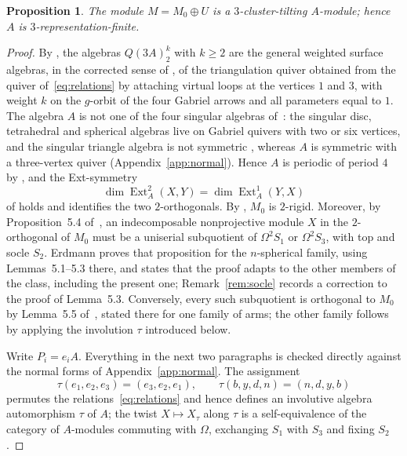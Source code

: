 \documentclass[11pt]{amsart}
\theoremstyle{plain}
\newtheorem{proposition}[theorem]{Proposition}
\theoremstyle{definition}
\DeclareMathOperator{\Ext}{Ext}
\begin{document}
\begin{proposition}\label{prop:RF}
The module $M=M_0\oplus U$ is a $3$-cluster-tilting $A$-module; hence $A$ is $3$-representation-finite.
\end{proposition}

\begin{proof}
By \cite[\S3.2]{Erdmann}, the algebras $Q(3A)^k_2$ with $k\ge2$ are the general weighted surface algebras, in
the corrected sense of \cite{ErdmannSkowronskiGV,ErdmannSkowronskiCorr}, of the triangulation quiver obtained
from the quiver of~\eqref{eq:relations} by attaching virtual loops at the vertices $1$ and $3$, with weight
$k$ on the $g$-orbit of the four Gabriel arrows and all parameters equal to $1$. The algebra $A$ is not one of
the four singular algebras of~\cite{ErdmannSkowronskiGV}: the singular disc, tetrahedral and spherical
algebras live on Gabriel quivers with two or six vertices, and the singular triangle algebra is not symmetric
\cite[Remark~4.1 and Proposition~4.9]{ErdmannSkowronskiGV}, whereas $A$ is symmetric with a three-vertex
quiver (Appendix~\ref{app:normal}). Hence $A$ is periodic of period $4$ by
\cite[Theorem~1.3]{ErdmannSkowronskiGV}, and the Ext-symmetry
\begin{equation}\label{eq:extsym}
 \dim\Ext^2_A(X,Y)=\dim\Ext^1_A(Y,X)
\end{equation}
of \cite[Corollary~2.1]{Erdmann} holds and identifies the two $2$-orthogonals. By
\cite[Proposition~4.3]{Erdmann}, $M_0$ is $2$-rigid. Moreover, by Proposition~5.4 of~\cite{Erdmann}, an
indecomposable nonprojective module $X$ in the $2$-orthogonal of $M_0$ must be a uniserial subquotient of
$\Omega^2S_1$ or $\Omega^2S_3$, with top and socle $S_2$. Erdmann proves that proposition for the
$n$-spherical family, using Lemmas~5.1--5.3 there, and states that the proof adapts to the other members of
the class, including the present one; Remark~\ref{rem:socle} records a correction to the proof of Lemma~5.3.
Conversely, every such subquotient is orthogonal to $M_0$ by Lemma~5.5 of~\cite{Erdmann}, stated there for one
family of arms; the other family follows by applying the involution $\tau$ introduced below.

Write $P_i=e_iA$. Everything in the next two paragraphs is checked directly against the normal forms of
Appendix~\ref{app:normal}. The assignment
\[
 \tau(e_1,e_2,e_3)=(e_3,e_2,e_1),\qquad \tau(b,y,d,n)=(n,d,y,b)
\]
permutes the relations~\eqref{eq:relations} and hence defines an involutive algebra automorphism $\tau$ of
$A$; the twist $X\mapsto X_\tau$ along $\tau$ is a self-equivalence of the category of $A$-modules commuting
with $\Omega$, exchanging $S_1$ with $S_3$ and fixing $S_2$.


\end{proof}
\end{document}
